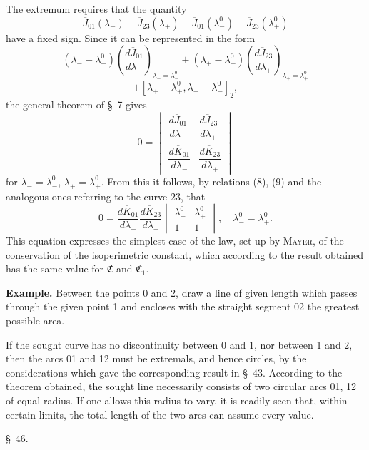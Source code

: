 \documentclass[11pt,a4paper,leqno]{article}
\begin{document}
The extremum requires that the quantity
\[
\overline{J}_{01}(\lambda_-)+\overline{J}_{23}(\lambda_+)-\overline{J}_{01}(\lambda_-^0)-\overline{J}_{23}(\lambda_+^0)
\]
have a fixed sign. Since it can be represented in the form
\[
(\lambda_- -\lambda_-^0)\left(\frac{d\overline{J}_{01}}{d\lambda_-}\right)_{\lambda_- =\lambda_-^0}
+(\lambda_+ -\lambda_+^0)\left(\frac{d\overline{J}_{23}}{d\lambda_+}\right)_{\lambda_+ =\lambda_+^0}
\]
\[
+[\lambda_+ -\lambda_+^0,\lambda_- -\lambda_-^0]_2,
\]
the general theorem of \S~7 gives
\[
0=
\begin{vmatrix}
\dfrac{d\overline{J}_{01}}{d\lambda_-}&\dfrac{d\overline{J}_{23}}{d\lambda_+}\\[1.2ex]
\dfrac{d\overline{K}_{01}}{d\lambda_-}&\dfrac{d\overline{K}_{23}}{d\lambda_+}
\end{vmatrix}
\]
for $\lambda_- =\lambda_-^0$, $\lambda_+ =\lambda_+^0$. From this it follows, by relations (8), (9) and the analogous ones referring to the curve 23, that
\[
0=\frac{d\overline{K}_{01}}{d\lambda_-}\frac{d\overline{K}_{23}}{d\lambda_+}
\begin{vmatrix}
\lambda_-^0&\lambda_+^0\\
1&1
\end{vmatrix},
\quad \lambda_-^0=\lambda_+^0.
\]
This equation expresses the simplest case of the law, set up by \textsc{Mayer}, of the conservation of the isoperimetric constant, which according to the result obtained has the same value for $\mathfrak{C}$ and $\mathfrak{C}_1$.

\textbf{Example.} Between the points 0 and 2, draw a line of given length which passes through the given point 1 and encloses with the straight segment 02 the greatest possible area.

If the sought curve has no discontinuity between 0 and 1, nor between 1 and 2, then the arcs 01 and 12 must be extremals, and hence circles, by the considerations which gave the corresponding result in \S~43. According to the theorem obtained, the sought line necessarily consists of two circular arcs 01, 12 of equal radius. If one allows this radius to vary, it is readily seen that, within certain limits, the total length of the two arcs can assume every value.

\begin{center}
{\large \S~46.}
\end{center}
\end{document}

